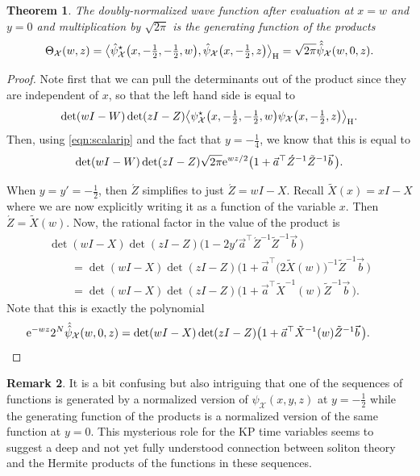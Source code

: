 \documentclass[10pt,a4paper]{amsart}
\numberwithin{equation}{section}
\newtheorem{Theorem}{Theorem}[section]
\theoremstyle{definition}
\newtheorem{Remark}[Theorem]{Remark}
\def\psistar{\psi^{\star}}
\def\X{\mathcal{X}}
\begin{document}
\begin{Theorem}\label{thm:normgen}
The doubly-normalized wave function after evaluation at $x=w$ and $y=0$
and multiplication by $\sqrt{2\pi}$ is the generating function of the products
\begin{equation}
\Theta_{\X}(w,z)= \big\langle \hat\psistar_{\X}\bigl(x,-\tfrac{1}{2},-\tfrac{1}{2},w\bigr),\hat\psi_{\X}\bigl(x,-\tfrac{1}{2},z\bigr)\big\rangle_{\rm H}
=\sqrt{2\pi}\hat{\hat\psi}_{\X}(w,0,z).\label{eqn:ipwz}
\end{equation}
\end{Theorem}
\begin{proof}
Note first that we can pull the determinants out of the
 product since they are independent of $x$, so that the left hand
 side is equal to
 \[
\det(wI-W)\det(zI-Z)\bigl\langle
 \psistar_{\X}\bigl(x,-\tfrac{1}{2},-\tfrac{1}{2},w\bigr)\psi_{\X}\bigl(x,-\tfrac{1}{2},z\bigr)\bigr\rangle_{\rm H}.
 \]
 Then, using \eqref{eqn:scalarip} and the fact that $y=-\tfrac{1}{4}$, we know that this is equal to
 \[
\det(wI-W)\det(zI-Z) \sqrt{2\pi }
{\rm e}^{wz/2}
 \bigl(1+\vec a^{\top}\acute Z^{-1}\tilde Z^{-1}\vec b\,\bigr).
 \]

When $y=y'=-\tfrac{1}{2}$, then
 $\acute Z$ simplifies to just $\acute Z=wI-X$.
Recall $\tilde X(x)=xI-X$ where we are now explicitly writing it as a
function of the variable $x$. Then $\acute Z=\tilde X(w)$.
Now, the rational factor in the value of the product is
\begin{gather*}
\det(wI-X)\det(zI-Z)
 \bigl(1-2y'\vec a^{\top}\acute Z^{-1}\tilde Z^{-1}\vec b\,\bigr)\\
\qquad=\det(wI-X)\det(zI-Z) \bigl(1+\vec a^{\top}\bigl(2 \tilde X(w)\bigr)^{-1}\tilde Z^{-1}\vec b\,\bigr)\\
\qquad =\det(wI-X)\det(zI-Z) \bigl(1+\vec a^{\top}\tilde X^{-1}(w)\tilde Z^{-1}\vec b\,\bigr).
\end{gather*}
 Note that this is exactly the polynomial
\begin{equation*}
{\rm e}^{-wz}2^N\hat{\hat \psi}_{\X}(w,0,z)=\det(w I-X)\det(zI-Z)\bigl(1+\vec a^{\top}\tilde X^{-1}(w)\tilde
 Z^{-1}\vec b\,\bigr).\tag*{\qed}
 \end{equation*}
 \renewcommand{\qed}{}
\end{proof}

\begin{Remark}
 It is a bit confusing but also intriguing that one of the sequences of
 functions is generated by a normalized version of $\psi_{\X}(x,y,z)$
 at $y=-\tfrac{1}{2}$ while the generating function of the products is a
 normalized version of the same function at $y=0$. This
mysterious role for the KP time variables seems to suggest a deep
and not yet fully understood connection between soliton theory and the
Hermite products of the functions in these sequences.
\end{Remark}
\end{document}
